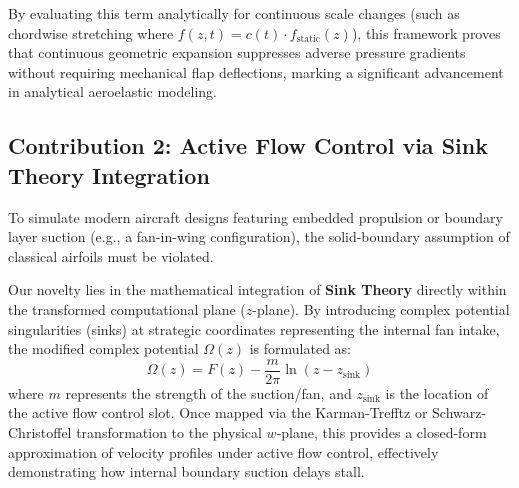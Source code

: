 \documentclass[12pt,a4paper]{article}
\begin{document}
By evaluating this term analytically for continuous scale changes (such as chordwise stretching where $f(z,t) = c(t) \cdot f_{\text{static}}(z)$), this framework proves that continuous geometric expansion suppresses adverse pressure gradients without requiring mechanical flap deflections, marking a significant advancement in analytical aeroelastic modeling.
\subsection{Contribution 2: Active Flow Control via Sink Theory Integration}
To simulate modern aircraft designs featuring embedded propulsion or boundary layer suction (e.g., a fan-in-wing configuration), the solid-boundary assumption of classical airfoils must be violated. 

Our novelty lies in the mathematical integration of \textbf{Sink Theory} directly within the transformed computational plane ($z$-plane). By introducing complex potential singularities (sinks) at strategic coordinates representing the internal fan intake, the modified complex potential $\Omega(z)$ is formulated as:
\begin{equation}
    \Omega(z) = F(z) - \frac{m}{2\pi} \ln(z - z_{\text{sink}})
\end{equation}
where $m$ represents the strength of the suction/fan, and $z_{\text{sink}}$ is the location of the active flow control slot. Once mapped via the Karman-Trefftz or Schwarz-Christoffel transformation to the physical $w$-plane, this provides a closed-form approximation of velocity profiles under active flow control, effectively demonstrating how internal boundary suction delays stall.
\end{document}
